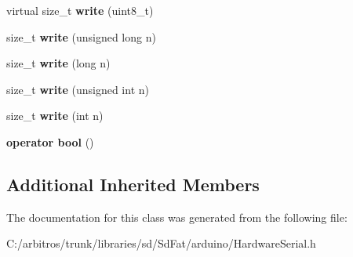 \begin{DoxyCompactItemize}
\item 
\hypertarget{class_hardware_serial_a0c15a57daf1517586523b8d270d34c7d}{virtual size\-\_\-t {\bfseries write} (uint8\-\_\-t)}\label{class_hardware_serial_a0c15a57daf1517586523b8d270d34c7d}

\item 
\hypertarget{class_hardware_serial_a0ba52a995edf9b6c2cdf3d396be84ff1}{size\-\_\-t {\bfseries write} (unsigned long n)}\label{class_hardware_serial_a0ba52a995edf9b6c2cdf3d396be84ff1}

\item 
\hypertarget{class_hardware_serial_a3cfec102ee6f58a2f7e617999ce9f5bb}{size\-\_\-t {\bfseries write} (long n)}\label{class_hardware_serial_a3cfec102ee6f58a2f7e617999ce9f5bb}

\item 
\hypertarget{class_hardware_serial_a2d9bc6ac05e45a7023be3cd1ca224407}{size\-\_\-t {\bfseries write} (unsigned int n)}\label{class_hardware_serial_a2d9bc6ac05e45a7023be3cd1ca224407}

\item 
\hypertarget{class_hardware_serial_a22e7ab55e0aa268cff5b48e763429ec3}{size\-\_\-t {\bfseries write} (int n)}\label{class_hardware_serial_a22e7ab55e0aa268cff5b48e763429ec3}

\item 
\hypertarget{class_hardware_serial_a9b3baad8c612d81b96e46f84d7e97580}{{\bfseries operator bool} ()}\label{class_hardware_serial_a9b3baad8c612d81b96e46f84d7e97580}

\end{DoxyCompactItemize}
\subsection*{Additional Inherited Members}


The documentation for this class was generated from the following file\-:\begin{DoxyCompactItemize}
\item 
C\-:/arbitros/trunk/libraries/sd/\-Sd\-Fat/arduino/Hardware\-Serial.\-h\end{DoxyCompactItemize}
